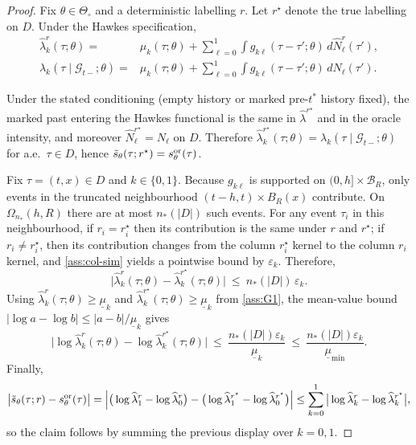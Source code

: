 \documentclass{statsoc}
\newcommand{\1}{\mathbbm{1}}
\begin{document}
\begin{proof}
Fix $\theta\in\Theta_\circ$ and a deterministic labelling $r$.
Let $r^\star$ denote the true labelling on $D$.
Under the Hawkes specification,
\begin{align*}
\widehat\lambda_k^r(\tau;\theta)
=&
\mu_k(\tau;\theta)+\sum_{\ell=0}^1\int g_{k\ell}(\tau-\tau';\theta)\,d\widehat N_\ell^r(\tau'),\\
\lambda_k(\tau\mid\mathcal G_{t-};\theta)
=&
\mu_k(\tau;\theta)+\sum_{\ell=0}^1\int g_{k\ell}(\tau-\tau';\theta)\,d N_\ell(\tau').
\end{align*}

Under the stated conditioning (empty history or marked pre-$t^\ast$ history fixed),
the marked past entering the Hawkes functional is the same in $\widehat\lambda^{r^\star}$ and in the oracle intensity,
and moreover $\widehat N_\ell^{r^\star}=N_\ell$ on $D$.
Therefore $\widehat\lambda_k^{r^\star}(\tau;\theta)=\lambda_k(\tau\mid\mathcal G_{t-};\theta)$ for a.e.\ $\tau\in D$, hence
$\tilde s_\theta(\tau;r^\star)=s^{\rm or}_\theta(\tau)$.

Fix $\tau=(t,x)\in D$ and $k\in\{0,1\}$. Because $g_{k\ell}$ is supported on $(0,h]\times \mathcal B_R$,
only events in the truncated neighbourhood $(t-h,t)\times B_R(x)$ contribute. On $\Omega_{n_*}(h,R)$ there are at most
$n_*(|D|)$ such events.
For any event $\tau_i$ in this neighbourhood, if $r_i=r_i^\star$ then its contribution is the same under $r$ and $r^\star$;
if $r_i\neq r_i^\star$, then its contribution changes from the column $r_i^\star$ kernel to the column $r_i$ kernel, and
\cref{ass:col-sim} yields a pointwise bound by $\varepsilon_k$.
Therefore,
\[
\big|\widehat\lambda_k^r(\tau;\theta)-\widehat\lambda_k^{r^\star}(\tau;\theta)\big|
\ \le\ n_*(|D|)\,\varepsilon_k.
\]
Using $\widehat\lambda_k^r(\tau;\theta)\ge \underline\mu_k$ and $\widehat\lambda_k^{r^\star}(\tau;\theta)\ge \underline\mu_k$
from \cref{ass:G1}, the mean-value bound $|\log a-\log b|\le |a-b|/\underline\mu_k$ gives
\[
\big|\log\widehat\lambda_k^r(\tau;\theta)-\log\widehat\lambda_k^{r^\star}(\tau;\theta)\big|
\ \le\ \frac{n_*(|D|)\varepsilon_k}{\underline\mu_k}
\ \le\ \frac{n_*(|D|)\varepsilon_k}{\underline\mu_{\min}}.
\]
Finally,
\[
\big|\tilde s_\theta(\tau;r)-s^{\rm or}_\theta(\tau)\big|
=
\Big|\big(\log\widehat\lambda_1^r-\log\widehat\lambda_0^r\big)
-\big(\log\widehat\lambda_1^{r^\star}-\log\widehat\lambda_0^{r^\star}\big)\Big|
\le
\sum_{k=0}^1\big|\log\widehat\lambda_k^r-\log\widehat\lambda_k^{r^\star}\big|,
\]
so the claim follows by summing the previous display over $k=0,1$.
\end{proof}
\end{document}
